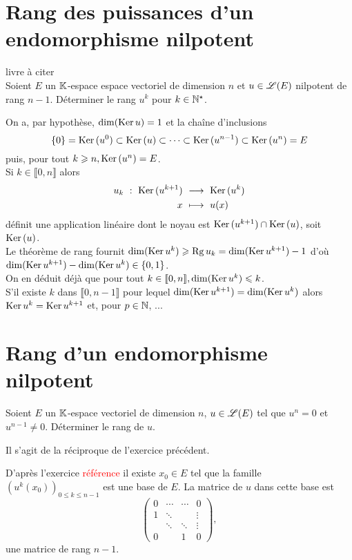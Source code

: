 \section{Rang des puissances d'un endomorphisme nilpotent} 
\begin{exercice}
    livre à citer \\
    Soient $E$ un $\mathbb{K}$-espace espace vectoriel de dimension $n$ et $u \in \mathscr{L}(E)$ nilpotent de rang $n-1$. Déterminer le rang $u^k$ pour $k \in \mathbb{N}^\star$. 
\end{exercice}

\begin{solution}
    On a, par hypothèse, $\dim(\mathrm{Ker}\, u) = 1$ et la chaîne d'inclusions
    $$\{0\} = \mathrm{Ker}\,(u^0) \subset \mathrm{Ker}\,(u) \subset \cdots \subset \mathrm{Ker}\,(u^{n-1}) \subset \mathrm{Ker}\,(u^n) = E$$
    puis, pour tout $k \geqslant n, \mathrm{Ker}\,(u^n) = E$. \\
    Si $k \in \llbracket 0, n \rrbracket$ alors 
    \begin{alignat*}{2}
        u_k\ :\ \mathrm{Ker}\,(u^{k+1})\ &\longrightarrow\ \mathrm{Ker}\,(u^k)\\
        x\ &\longmapsto\ u(x)
    \end{alignat*}
    définit une application linéaire dont le noyau est $\mathrm{Ker}\,(u^{k+1}) \cap \mathrm{Ker}\,(u)$, soit $\mathrm{Ker}\,(u)$. \\
    Le théorème de rang fournit $\dim(\mathrm{Ker}\, u^k) \geqslant \mathrm{Rg}\, u_k = \dim( \mathrm{Ker}\, u^{k+1}) - 1$ d'où $\dim(\mathrm{Ker}\, u^{k+1}) - \dim(\mathrm{Ker}\, u^k) \in \{ 0, 1 \}$. \\
    On en déduit déjà que pour tout $k \in \llbracket 0, n \rrbracket, \dim(\mathrm{Ker}\, u^k) \leqslant k$. \\
    S'il existe $k$ dans $\llbracket 0, n-1 \rrbracket$ pour lequel $\dim( \mathrm{Ker}\, u^{k+1}) = \dim(\mathrm{Ker}\, u^k)$ alors $\mathrm{Ker}\, u^k = \mathrm{Ker}\, u^{k+1}$ et, pour $p \in \mathbb{N}$, 
    ...
\end{solution}

\section{Rang d'un endomorphisme nilpotent} 
\begin{exercice}
    Soient $E$ un $\mathbb{K}$-espace vectoriel de dimension $n$, $u \in \mathscr{L}(E)$ tel que $u^n = 0$ et $u^{n-1} \not= 0$. Déterminer le rang de $u$.
\end{exercice}

Il s'agit de la réciproque de l'exercice précédent.

\begin{solution}
    D'après l'exercice \textcolor{red}{référence} il existe $x_0 \in E$ tel que la famille $\left( u^k(x_0)\right)_{0 \leqslant k \leqslant n-1}$ est une base de $E$. La matrice de $u$ dans cette base est 
    $$
    \begin{pmatrix}
        0 & \cdots & \cdots & 0 \\
        1 & \ddots & & \vdots \\
        & \ddots & \ddots & \vdots \\
        0 & & 1 & 0
    \end{pmatrix},
    $$
    une matrice de rang $n-1$.
\end{solution}
